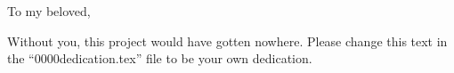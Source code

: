 To my beloved,

Without you, this project would have gotten nowhere.
Please change this text in the ``0000dedication.tex'' file to be your own dedication.
